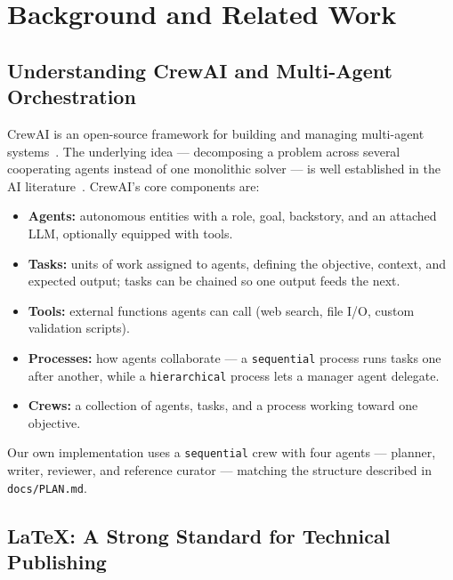 
\chapter{Background and Related Work}

\section{Understanding CrewAI and Multi-Agent Orchestration}

CrewAI is an open-source framework for building and managing multi-agent
systems~\cite{crewai_docs}. The underlying idea --- decomposing a problem
across several cooperating agents instead of one monolithic solver --- is
well established in the AI literature~\cite{wooldridge2009mas,
russell2020aima}. CrewAI's core components are:

\begin{itemize}
  \item \textbf{Agents:} autonomous entities with a role, goal, backstory,
        and an attached LLM, optionally equipped with tools.
  \item \textbf{Tasks:} units of work assigned to agents, defining the
        objective, context, and expected output; tasks can be chained so one
        output feeds the next.
  \item \textbf{Tools:} external functions agents can call (web search, file
        I/O, custom validation scripts).
  \item \textbf{Processes:} how agents collaborate --- a \texttt{sequential}
        process runs tasks one after another, while a \texttt{hierarchical}
        process lets a manager agent delegate.
  \item \textbf{Crews:} a collection of agents, tasks, and a process working
        toward one objective.
\end{itemize}

Our own implementation uses a \texttt{sequential} crew with four agents ---
planner, writer, reviewer, and reference curator --- matching the structure
described in \texttt{docs/PLAN.md}.

\section{LaTeX: A Strong Standard for Technical Publishing}

